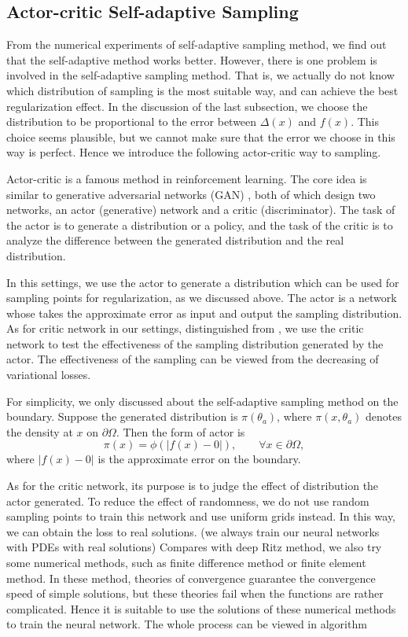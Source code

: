 \documentclass{article}
\begin{document}
\subsection{Actor-critic Self-adaptive Sampling}
\par From the numerical experiments of self-adaptive sampling method, we find out that the self-adaptive method works better. However, there is one problem is involved in the self-adaptive sampling method. That is, we actually do not know which distribution of sampling is the most suitable way, and can achieve the best regularization effect. In the discussion of the last subsection, we choose the distribution to be proportional to the error between $\Delta(x)$ and $f(x)$. This choice seems plausible, but we cannot make sure that the error we choose in this way is perfect. Hence we introduce the following actor-critic way to sampling.
\par Actor-critic \cite{konda2000actor} is a famous method in reinforcement learning. The core idea is similar to generative adversarial networks (GAN) \cite{goodfellow2014generative}, both of which design two networks, an actor (generative) network and a critic (discriminator). The task of the actor is to generate a distribution or a policy, and the task of the critic is to analyze the difference between the generated distribution and the real distribution.
\par In this settings, we use the actor to generate a distribution which can be used for sampling points for regularization, as we discussed above. The actor is a network whose takes the approximate error as input and output the sampling distribution. As for critic network in our settings, distinguished from \cite{goodfellow2014generative} \cite{konda2000actor}, we use the critic network to test the effectiveness of the sampling distribution generated by the actor. The effectiveness of the sampling can be viewed from the decreasing of variational losses. 
\par For simplicity, we only discussed about the self-adaptive sampling method on the boundary. Suppose the generated distribution is $\pi(\theta_a)$, where $\pi(x, \theta_{a})$ denotes the density at $x$ on $\partial\Omega$. Then the form of actor is
\begin{equation}
	\pi(x) = \phi(|f(x)-0|), \qquad \forall x\in\partial\Omega,
\end{equation}
where $|f(x) - 0|$ is the approximate error on the boundary.
\par As for the critic network, its purpose is to judge the effect of distribution the actor generated. To reduce the effect of randomness, we do not use random sampling points to train this network and use uniform grids instead. In this way, we can obtain the loss to real solutions. (we always train our neural networks with PDEs with real solutions) Compares with deep Ritz method, we also try some numerical methods, such as finite difference method or finite element method. In these method, theories of convergence guarantee the convergence speed of simple solutions, but these theories fail when the functions are rather complicated. Hence it is suitable to use the solutions of these numerical methods to train the neural network. The whole process can be viewed in algorithm 
\end{document}
